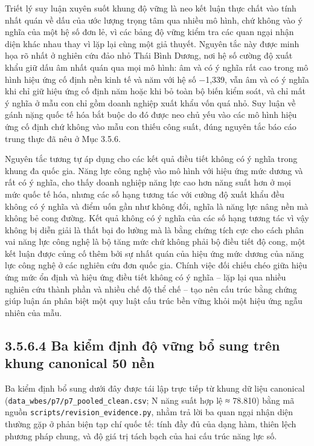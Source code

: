 \documentclass[
  a4paper,
  13pt]{extreport}
\begin{document}
Triết lý suy luận xuyên suốt khung độ vững là neo kết luận thực chất vào
tính nhất quán về dấu của ước lượng trọng tâm qua nhiều mô hình, chứ
không vào ý nghĩa của một hệ số đơn lẻ, vì các bảng độ vững kiểm tra các
quan ngại nhận diện khác nhau thay vì lặp lại cùng một giả thuyết.
Nguyên tắc này được minh họa rõ nhất ở nghiên cứu đảo nhỏ Thái Bình
Dương, nơi hệ số cường độ xuất khẩu giữ dấu âm nhất quán qua mọi mô
hình: âm và có ý nghĩa rất cao trong mô hình hiệu ứng cố định nền kinh
tế và năm với hệ số −1,339, vẫn âm và có ý nghĩa khi chỉ giữ hiệu ứng cố
định năm hoặc khi bỏ toàn bộ biến kiểm soát, và chỉ mất ý nghĩa ở mẫu
con chỉ gồm doanh nghiệp xuất khẩu vốn quá nhỏ. Suy luận về gánh nặng
quốc tế hóa bắt buộc do đó được neo chủ yếu vào các mô hình hiệu ứng cố
định chứ không vào mẫu con thiếu công suất, đúng nguyên tắc báo cáo
trung thực đã nêu ở Mục 3.5.6.

Nguyên tắc tương tự áp dụng cho các kết quả điều tiết không có ý nghĩa
trong khung đa quốc gia. Năng lực công nghệ vào mô hình với hiệu ứng mức
dương và rất có ý nghĩa, cho thấy doanh nghiệp năng lực cao hơn năng
suất hơn ở mọi mức quốc tế hóa, nhưng các số hạng tương tác với cường độ
xuất khẩu đều không có ý nghĩa và điểm uốn gần như không đổi, nghĩa là
năng lực nâng nền mà không bẻ cong đường. Kết quả không có ý nghĩa của
các số hạng tương tác vì vậy không bị diễn giải là thất bại đo lường mà
là bằng chứng tích cực cho cách phân vai năng lực công nghệ là bộ tăng
mức chứ không phải bộ điều tiết độ cong, một kết luận được củng cố thêm
bởi sự nhất quán của hiệu ứng mức dương của năng lực công nghệ ở các
nghiên cứu đơn quốc gia. Chính việc đối chiếu chéo giữa hiệu ứng mức ổn
định và hiệu ứng điều tiết không có ý nghĩa -- lặp lại qua nhiều nghiên
cứu thành phần và nhiều chế độ thể chế -- tạo nên cấu trúc bằng chứng
giúp luận án phân biệt một quy luật cấu trúc bền vững khỏi một hiệu ứng
ngẫu nhiên của mẫu.

\hypertarget{ba-kiux1ec3m-ux111ux1ecbnh-ux111ux1ed9-vux1eefng-bux1ed5-sung-truxean-khung-canonical-50-nux1ec1n}{%
\subsection{3.5.6.4 Ba kiểm định độ vững bổ sung trên khung canonical 50
nền}\label{ba-kiux1ec3m-ux111ux1ecbnh-ux111ux1ed9-vux1eefng-bux1ed5-sung-truxean-khung-canonical-50-nux1ec1n}}

Ba kiểm định bổ sung dưới đây được tái lập trực tiếp từ khung dữ liệu
canonical (\texttt{data\_wbes/p7/p7\_pooled\_clean.csv}; N năng suất hợp
lệ ≈ 78.810) bằng mã nguồn \texttt{scripts/revision\_evidence.py}, nhằm
trả lời ba quan ngại nhận diện thường gặp ở phản biện tạp chí quốc tế:
tính đầy đủ của dạng hàm, thiên lệch phương pháp chung, và độ giá trị
tách bạch của hai cấu trúc năng lực số.
\end{document}
